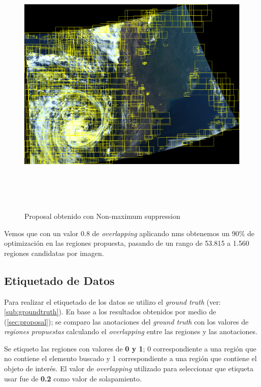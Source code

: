 \begin{figure}[H]
 \centering
  \includegraphics[height=13cm,keepaspectratio=true,clip=true]{imagenes/Logos/proposalconNMS.png}
  \caption{Proposal obtenido con Non-maximum suppression}
	\label{Fig: proposalnms}
\end{figure}

Vemos que con un valor 0.8 de \textit{overlapping} aplicando \ac{nms} obtenemos un 90\% de optimización en las regiones propuesta, pasando de un rango de  53.815 a 1.560 regiones candidatas por imagen.


\subsection{Etiquetado de Datos}\label{sub:etiquetado}

Para realizar el etiquetado de los datos se utilizo el \textit{ground truth} (ver: \ref{sub:groundtruth}). En base a los resultados obtenidos por medio de (\ref{sec:proposal}); se comparo las anotaciones del \textit{ground truth} con los valores de \textit{regiones propuestas} calculando el \textit{overlapping} entre las regiones y las anotaciones.

Se etiqueto las regiones con valores de \textbf{0 y 1}; 0 correspondiente a una región que no contiene el elemento buscado y 1 correspondiente a una región  que contiene el objeto de interés. El valor de \textit{overlapping} utilizado para seleccionar que etiqueta usar fue de \textbf{0.2} como valor de  solapamiento.

